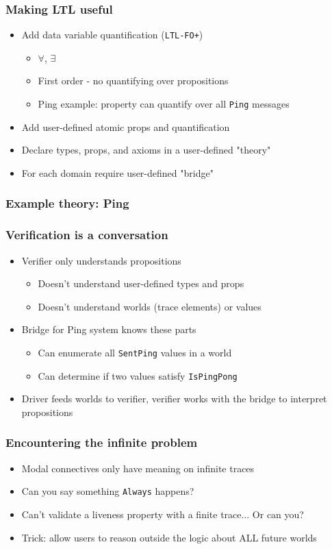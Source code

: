 \documentclass[12pt,aspectratio=169]{beamer}
\begin{document}
\begin{frame}
\frametitle{Making LTL useful}
\begin{itemize}
  \item Add data variable quantification (\texttt{LTL-FO+})
  \begin{itemize}
    \item $\forall$, $\exists$
    \item First order - no quantifying over propositions
    \item Ping example: property can quantify over all \texttt{Ping} messages
  \end{itemize}
  \item Add user-defined atomic props and quantification
  \item Declare types, props, and axioms in a user-defined "theory"
  \item For each domain require user-defined "bridge"
\end{itemize}
\end{frame}

\begin{frame}
\frametitle{Example theory: Ping}
  {\fontsize{10}{12}\selectfont
    
  }
\end{frame}

\begin{frame}
\frametitle{Verification is a conversation}
\begin{itemize}
  \item Verifier only understands propositions
  \begin{itemize}
    \item Doesn't understand user-defined types and props
    \item Doesn't understand worlds (trace elements) or values
  \end{itemize}
  \item Bridge for Ping system knows these parts
  \begin{itemize}
    \item Can enumerate all \texttt{SentPing} values in a world
    \item Can determine if two values satisfy \texttt{IsPingPong}
  \end{itemize}
  \item Driver feeds worlds to verifier, verifier works with the bridge to interpret propositions
\end{itemize}
\end{frame}

\begin{frame}
\frametitle{Encountering the infinite problem}
\begin{itemize}
  \item Modal connectives only have meaning on infinite traces
  \item Can you say something \texttt{Always} happens?
  \item Can't validate a liveness property with a finite trace... Or can you?
  \item Trick: allow users to reason outside the logic about ALL future worlds
\end{itemize}
\end{frame}
\end{document}
